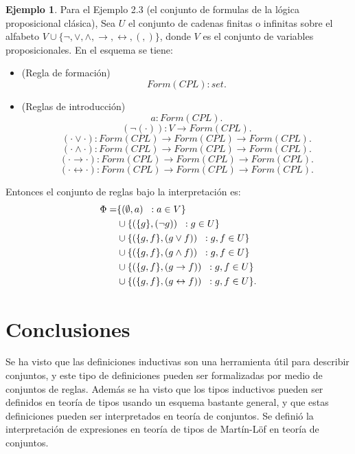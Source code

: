 \documentclass[11pt,oneside]{report}
\theoremstyle{plain}
\theoremstyle{definition}
\newtheorem{ejemplo}{Ejemplo}[chapter]
\begin{document}
\begin{ejemplo}
    Para el Ejemplo 2.3 (el conjunto de formulas de la lógica proposicional clásica), Sea $U$ el conjunto de cadenas finitas o infinitas sobre el alfabeto $V \cup \{\lnot, \lor, \land, \rightarrow, \leftrightarrow, (, )\}$, donde $V$ es el conjunto de variables proposicionales. En el esquema se tiene:
    \begin{itemize}
        \item (Regla de formación)
              $$Form(CPL) : set.$$
        \item (Reglas de introducción)
              $$a:Form(CPL).$$
              $$(\lnot (\cdot)):V\to Form(CPL).$$
              $$(\cdot\lor \cdot): Form(CPL)\to Form(CPL)\to Form(CPL).$$
              $$(\cdot\land \cdot): Form(CPL)\to Form(CPL)\to Form(CPL).$$
              $$(\cdot\rightarrow \cdot): Form(CPL)\to Form(CPL)\to Form(CPL).$$
              $$(\cdot\leftrightarrow \cdot): Form(CPL)\to Form(CPL)\to Form(CPL).$$
    \end{itemize}

    Entonces el conjunto de reglas bajo la interpretación es:
    \begin{align*}
        \Phi = & \{(\emptyset, a)\hspace{2mm}: a \in V\}\\
               & \cup \{(\{g\}, (\lnot g))\hspace{2mm}: g \in U\}\\
               & \cup \{(\{g, f\}, (g\lor f))\hspace{2mm}: g, f \in U\} \\
               & \cup \{(\{g, f\}, (g\land f))\hspace{2mm}: g, f \in U\} \\
               & \cup \{(\{g, f\}, (g\rightarrow f))\hspace{2mm}: g, f \in U\}      \\
               & \cup \{(\{g, f\}, (g\leftrightarrow f))\hspace{2mm}: g, f \in U\}
    .\end{align*}
\end{ejemplo}

\chapter*{Conclusiones}
Se ha visto que las definiciones inductivas son una herramienta útil para describir conjuntos, y este tipo de definiciones pueden ser formalizadas por medio de conjuntos de reglas. Además se ha visto que los tipos inductivos pueden ser definidos en teoría de tipos usando un esquema bastante general, y que estas definiciones pueden ser interpretados en teoría de conjuntos. Se definió la interpretación de expresiones en teoría de tipos de Martín-Löf en teoría de conjuntos.
\end{document}
